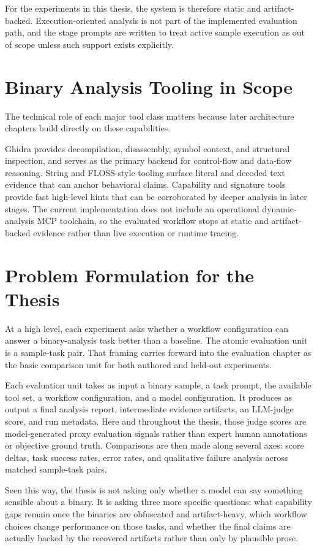 For the experiments in this thesis, the system is therefore static and artifact-backed. Execution-oriented analysis is not part of the implemented evaluation path, and the stage prompts are written to treat active sample execution as out of scope unless such support exists explicitly.

\section{Binary Analysis Tooling in Scope}

The technical role of each major tool class matters because later architecture chapters build directly on these capabilities.

Ghidra provides decompilation, disassembly, symbol context, and structural inspection, and serves as the primary backend for control-flow and data-flow reasoning. String and FLOSS-style tooling surface literal and decoded text evidence that can anchor behavioral claims. Capability and signature tools provide fast high-level hints that can be corroborated by deeper analysis in later stages. The current implementation does not include an operational dynamic-analysis MCP toolchain, so the evaluated workflow stops at static and artifact-backed evidence rather than live execution or runtime tracing.

\section{Problem Formulation for the Thesis}

At a high level, each experiment asks whether a workflow configuration can answer a binary-analysis task better than a baseline. The atomic evaluation unit is a sample-task pair. That framing carries forward into the evaluation chapter as the basic comparison unit for both authored and held-out experiments.

Each evaluation unit takes as input a binary sample, a task prompt, the available tool set, a workflow configuration, and a model configuration. It produces as output a final analysis report, intermediate evidence artifacts, an LLM-judge score, and run metadata. Here and throughout the thesis, those judge scores are model-generated proxy evaluation signals rather than expert human annotations or objective ground truth. Comparisons are then made along several axes: score deltas, task success rates, error rates, and qualitative failure analysis across matched sample-task pairs.

Seen this way, the thesis is not asking only whether a model can say something sensible about a binary. It is asking three more specific questions: what capability gaps remain once the binaries are obfuscated and artifact-heavy, which workflow choices change performance on those tasks, and whether the final claims are actually backed by the recovered artifacts rather than only by plausible prose.
